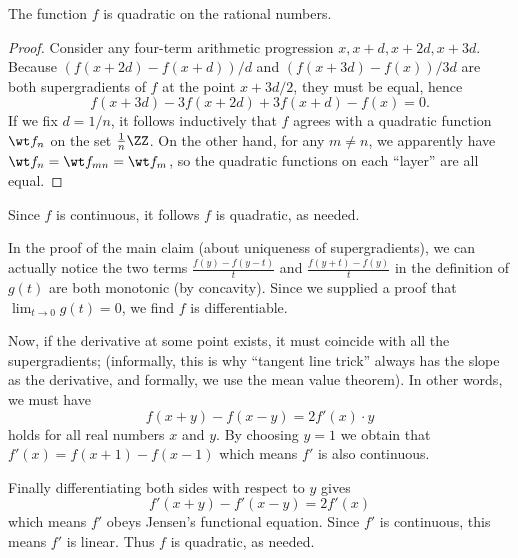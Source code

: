 \documentclass[11pt]{scrartcl}
\begin{document}
\begin{claim*}
  The function $f$ is quadratic on the rational numbers.
\end{claim*}
\begin{proof}
Consider any four-term arithmetic progression $x, x+d, x+2d, x+3d$.
Because $(f(x+2d)-f(x+d))/d$ and $(f(x+3d)-f(x))/3d$ are both
supergradients of $f$ at the point $x+3d/2$, they must be equal, hence
\begin{equation} \label{quadratic}
  f(x+3d) - 3f(x+2d) + 3f(x+d) - f(x) = 0.
\end{equation}
If we fix $d = 1/n$, it follows inductively
that $f$ agrees with a quadratic function $\wt f_n$ on the set $\frac1n \ZZ$.
On the other hand, for any $m \neq n$,
we apparently have $\wt f_n = \wt f_{mn} = \wt f_m$,
so the quadratic functions on each ``layer'' are all equal.
\end{proof}
Since $f$ is continuous, it follows $f$ is quadratic, as needed.

\begin{remark*}
  In the proof of the main claim (about uniqueness of supergradients),
  we can actually notice the two terms $\frac{f(y)-f(y-t)}{t}$
  and $\frac{f(y+t)-f(y)}{t}$ in the definition of $g(t)$ are both monotonic
  (by concavity).
  Since we supplied a proof that $\lim_{t \to 0} g(t) = 0$,
  we find $f$ is differentiable.

  Now, if the derivative at some point exists,
  it must coincide with all the supergradients;
  (informally, this is why ``tangent line trick'' always has the slope
  as the derivative, and formally, we use the mean value theorem).
  In other words, we must have
  \[ f(x+y) - f(x-y) = 2f'(x) \cdot y \]
  holds for all real numbers $x$ and $y$.
  By choosing $y=1$ we obtain that $f'(x) = f(x+1) - f(x-1)$
  which means $f'$ is also continuous.

  Finally differentiating both sides with respect to $y$ gives
  \[ f'(x+y) - f'(x-y) = 2f'(x) \]
  which means $f'$ obeys Jensen's functional equation.
  Since $f'$ is continuous, this means $f'$ is linear.
  Thus $f$ is quadratic, as needed.
\end{remark*}
\pagebreak
\end{document}
